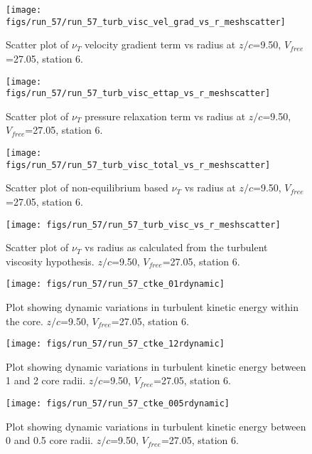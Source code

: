\begin{figure}[H]
\centering
\texttt{[image: figs/run\_57/run\_57\_turb\_visc\_vel\_grad\_vs\_r\_meshscatter]}
\caption{Scatter plot of $\nu_T$ velocity gradient term vs radius at $z/c$=9.50, $V_{free}$=27.05, station 6.}
\end{figure}


\begin{figure}[H]
\centering
\texttt{[image: figs/run\_57/run\_57\_turb\_visc\_ettap\_vs\_r\_meshscatter]}
\caption{Scatter plot of $\nu_T$ pressure relaxation term vs radius at $z/c$=9.50, $V_{free}$=27.05, station 6.}
\end{figure}


\begin{figure}[H]
\centering
\texttt{[image: figs/run\_57/run\_57\_turb\_visc\_total\_vs\_r\_meshscatter]}
\caption{Scatter plot of non-equilibrium based $\nu_T$ vs radius at $z/c$=9.50, $V_{free}$=27.05, station 6.}
\end{figure}


\begin{figure}[H]
\centering
\texttt{[image: figs/run\_57/run\_57\_turb\_visc\_vs\_r\_meshscatter]}
\caption{Scatter plot of $\nu_T$ vs radius as calculated from the turbulent viscosity hypothesis. $z/c$=9.50, $V_{free}$=27.05, station 6.}
\end{figure}


\begin{figure}[H]
\centering
\texttt{[image: figs/run\_57/run\_57\_ctke\_01rdynamic]}
\caption{Plot showing dynamic variations in turbulent kinetic energy within the core. $z/c$=9.50, $V_{free}$=27.05, station 6.}
\end{figure}


\begin{figure}[H]
\centering
\texttt{[image: figs/run\_57/run\_57\_ctke\_12rdynamic]}
\caption{Plot showing dynamic variations in turbulent kinetic energy between 1 and 2 core radii. $z/c$=9.50, $V_{free}$=27.05, station 6.}
\end{figure}


\begin{figure}[H]
\centering
\texttt{[image: figs/run\_57/run\_57\_ctke\_005rdynamic]}
\caption{Plot showing dynamic variations in turbulent kinetic energy between 0 and 0.5 core radii. $z/c$=9.50, $V_{free}$=27.05, station 6.}
\end{figure}


